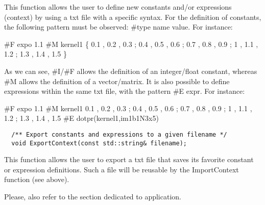 This function allows the user to define new constants and/or expressions (context) by using a txt file with a specific syntax.
For the definition of constants, the following pattern must be observed:
\newline  \#type name value. 
\newline For instance:


\#F expo 1.1 \newline 
\#M kernel1 \{ 0.1 , 0.2 , 0.3 ; 0.4 , 0.5 , 0.6 ; 0.7 , 0.8 , 0.9 ; 1 , 1.1 , 1.2 ; 1.3 , 1.4 , 1.5 \} \newline

As we can see,  \#I/\#F allows the definition of an integer/float constant, 
whereas \#M allows the definition of a vector/matrix. It is also possible 
to define expressions within the same txt file, with the pattern \#E expr. 
For instance:

\#F expo 1.1 \newline 
\#M kernel1 { 0.1 , 0.2 , 0.3 ; 0.4 , 0.5 , 0.6 ; 0.7 , 0.8 , 0.9 ; 1 , 1.1 , 1.2 ; 1.3 , 1.4 , 1.5 } \newline 
\#E dotpr(kernel1,im1b1N3x5) \newline

\begin{verbatim}
  /** Export constants and expressions to a given filename */
  void ExportContext(const std::string& filename);
\end{verbatim}

This function allows the user to export a txt file that saves its 
favorite constant or expression definitions. Such a file will be 
reusable by the ImportContext function (see above).

Please, also refer to the section dedicated to  application.



